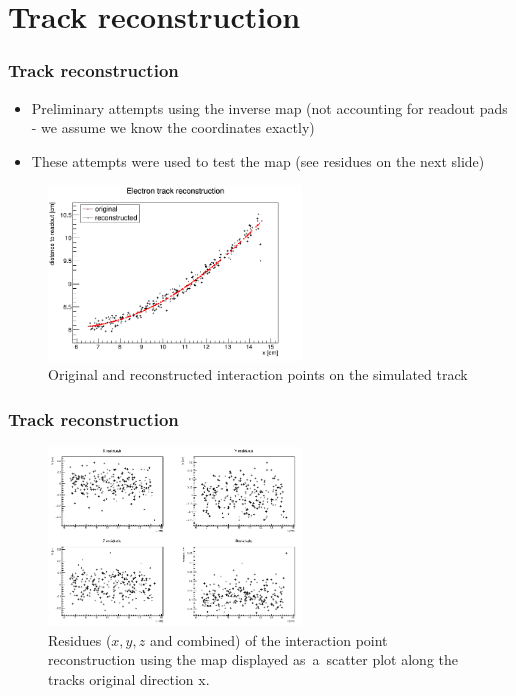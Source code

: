 \documentclass{beamer}
\begin{document}
	\section{Track reconstruction}
	\begin{frame}
		\frametitle{Track reconstruction}
		\begin{itemize}
			\item Preliminary attempts using the inverse map (not accounting for readout pads - we assume we know the coordinates exactly)
			\item These attempts were used to test the map (see residues on the next slide)
		\end{itemize}
		\begin{figure}
			\centering
			\includegraphics[width=0.6\textwidth]{images/reco_track.png}
			\caption{Original and reconstructed interaction points on the simulated track}
		\end{figure}
	\end{frame}
	\begin{frame}
		\frametitle{Track reconstruction}
		\begin{figure}
			\centering
			\includegraphics[width=0.6\textwidth]{images/residues_scatter.png}
			\caption{Residues ($x,y,z$ and combined) of the interaction point reconstruction using the map displayed as~a~scatter plot along the tracks original direction x.}
		\end{figure}
	\end{frame}
\end{document}

